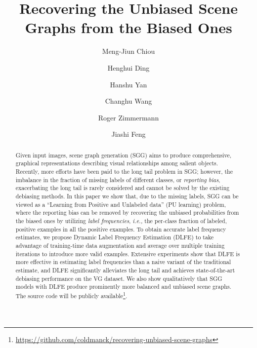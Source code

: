 \documentclass[sigconf]{acmart}
\begin{document}
\title{
Recovering the Unbiased Scene Graphs from the Biased Ones 
}

\author{Meng-Jiun Chiou}

\author{Henghui Ding}

\author{Hanshu Yan}

\author{Changhu Wang}

\author{Roger Zimmermann}

\author{Jiashi Feng}







\renewcommand{\shortauthors}{}

\begin{abstract}
    Given input images, scene graph generation (SGG) aims to produce comprehensive, graphical representations describing visual relationships among salient objects.
    Recently, more efforts have been paid to the long tail problem in SGG; however, the imbalance in the fraction of missing labels of different classes, or \textit{reporting bias}, exacerbating the long tail is rarely considered and cannot be solved by the existing debiasing methods.
    In this paper we show that, due to the missing labels, SGG can be viewed as a ``Learning from Positive and Unlabeled data'' (PU learning) problem, where the reporting bias can be removed by recovering the unbiased probabilities from the biased ones by utilizing \textit{label frequencies}, \emph{i.e.,} the per-class fraction of labeled, positive examples in all the positive examples.
    To obtain accurate label frequency estimates, we propose Dynamic Label Frequency Estimation (DLFE) to take advantage of training-time data augmentation and average over multiple training iterations to introduce more valid examples.
    Extensive experiments show that DLFE is more effective in estimating label frequencies than a naive variant of the traditional estimate, and DLFE significantly alleviates the long tail and achieves state-of-the-art debiasing performance on the VG dataset.
    We also show qualitatively that SGG models with DLFE produce prominently more balanced and unbiased scene graphs.
    The source code will be publicly available\footnote{\url{https://github.com/coldmanck/recovering-unbiased-scene-graphs}}.
\end{abstract}
\end{document}
